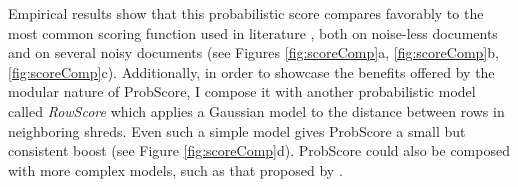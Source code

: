 \documentclass[letterpaper]{article}
\begin{document}
Empirical results show that this probabilistic score compares favorably to the most common scoring function used in literature \cite{P7}, both on noise-less documents and on several noisy documents (see Figures \ref{fig:scoreComp}a, \ref{fig:scoreComp}b, \ref{fig:scoreComp}c). Additionally, in order to showcase the benefits offered by the modular nature of ProbScore, I compose it with another probabilistic model called \emph{RowScore} which applies a Gaussian model to the distance between rows in neighboring shreds. Even such a simple model gives ProbScore a small but consistent boost (see Figure \ref{fig:scoreComp}d). ProbScore could also be composed with more complex models, such as that proposed by \cite{P8}.
\begin{figure}[h]
\setlength{\abovecaptionskip}{8pt plus 1.0pt minus 2.0pt}


\end{figure}
\end{document}
